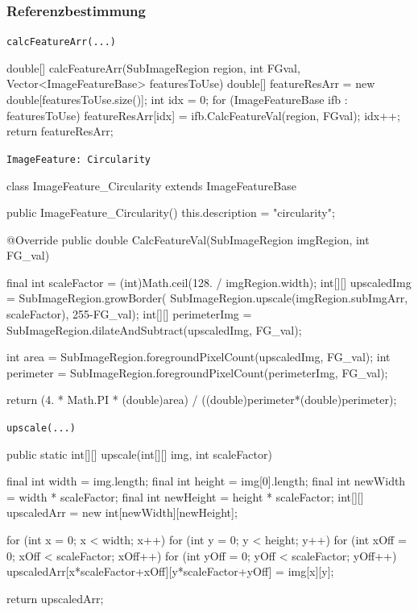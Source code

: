 \documentclass[german,notitlepage,smartquotes]{hgbreport}
\begin{document}
\subsubsection{Referenzbestimmung}

\begin{program}
\caption{\texttt{calcFeatureArr(...)}}
\label{prog:calc-feature-arr}
\begin{JavaCode}
double[] calcFeatureArr(SubImageRegion region, int FGval, Vector<ImageFeatureBase> featuresToUse) {
	double[] featureResArr = new double[featuresToUse.size()];
	int idx = 0;
	for (ImageFeatureBase ifb : featuresToUse) {
		featureResArr[idx] = ifb.CalcFeatureVal(region, FGval);
		idx++;
	}
	return featureResArr;
}
\end{JavaCode}
\end{program}

\begin{program}
\caption{\texttt{ImageFeature: Circularity}}
\label{prog:img-feature-circularity}
\begin{JavaCode}
class ImageFeature_Circularity extends ImageFeatureBase {
	public ImageFeature_Circularity() {
		this.description = "circularity";
	}

	@Override
	public double CalcFeatureVal(SubImageRegion imgRegion, int FG_val) {
		final int scaleFactor = (int)Math.ceil(128. / imgRegion.width);
		int[][] upscaledImg =
				SubImageRegion.growBorder(
						SubImageRegion.upscale(imgRegion.subImgArr, scaleFactor),
						255-FG_val);
		int[][] perimeterImg = SubImageRegion.dilateAndSubtract(upscaledImg, FG_val);

		int area = SubImageRegion.foregroundPixelCount(upscaledImg, FG_val);
		int perimeter = SubImageRegion.foregroundPixelCount(perimeterImg, FG_val);

		return (4. * Math.PI * (double)area) / ((double)perimeter*(double)perimeter);
	}
}
\end{JavaCode}
\end{program}

\begin{program}
\caption{\texttt{upscale(...)}}
\label{prog:upscale}
\begin{JavaCode}
public static int[][] upscale(int[][] img, int scaleFactor) {
	final int width = img.length;
	final int height = img[0].length;
	final int newWidth  = width * scaleFactor;
	final int newHeight = height * scaleFactor;
	int[][] upscaledArr = new int[newWidth][newHeight];

	for (int x = 0; x < width; x++) {
		for (int y = 0; y < height; y++) {
			for (int xOff = 0; xOff < scaleFactor; xOff++) {
				for (int yOff = 0; yOff < scaleFactor; yOff++) {
					upscaledArr[x*scaleFactor+xOff][y*scaleFactor+yOff] = img[x][y];
				}
			}
		}
	}

	return upscaledArr;
}
\end{JavaCode}
\end{program}
\end{document}
